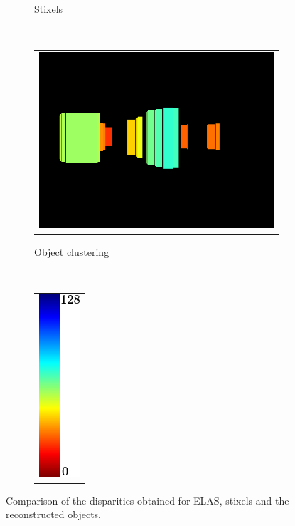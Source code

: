 \begin{figure}[h!]
\begin{subfigure}[b]{0.29\textwidth}
\begin{tabular}{c}
	  \end{tabular}
	  \caption{Stixels}\label{fig:cp04_reconstruction_stixels}
        \end{subfigure}%
        ~~~
        \begin{subfigure}[b]{0.29\textwidth}
	  \begin{tabular}{c}
	    \includegraphics[height=0.375\figuresheight]{objects}
	  \end{tabular}
	  \caption{Object clustering}\label{fig:cp04_reconstruction_objects}
        \end{subfigure}%
        ~~~
        \begin{subfigure}[b]{0.29\textwidth}
	  \begin{tabular}{c}
	    \includegraphics[height=0.375\figuresheight]{colorscale_jet}
	  \end{tabular}
	  \caption*{}\label{fig:cp04_reconstruction_colorscale}
        \end{subfigure}%
        \caption{Comparison of the disparities obtained for \ac{ELAS}, stixels and the reconstructed objects.}\label{fig:cp04_reconstruction}
\end{figure}

